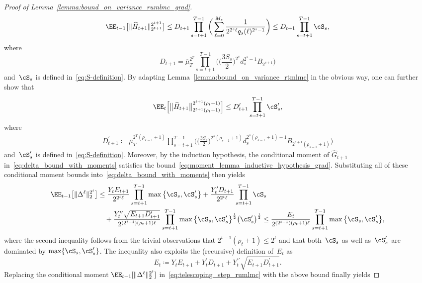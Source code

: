 \documentclass[11pt]{article}
\let\hat\widehat
\begin{document}
\begin{proof}[Proof of Lemma~\ref{lemma:bound_on_variance_rumlmc_grad}]
\[
    \EE_{t-1}\big[\|\hat H_{t+1}\|_{2^{t+1}}^{2^{t+1}}\big]
    \leq D_{t+1}\prod_{s=t+1}^{T-1}\bigg(\sum_{\ell=0}^{M_s}\frac{1}{2^{2^{s}\ell} q_s(\ell)^{2^{s}-1}}\bigg) \leq D_{t+1}\prod_{s=t+1}^{T-1} \cS_s, 
\]  
where
\[
 D_{t+1} = \overline\mu_T^{2^T} \prod_{s=t+1}^{T-1} \bigg(\bigg(\frac{3S_s}{2}\bigg)^{2^s} d_s^{2^s-1} B_{2^{s+1}}\bigg)
\]
and~$\cS_s$ is defined in~\eqref{eq:S-definition}. By adapting Lemma~\ref{lemma:bound_on_variance_rtmlmc} in the obvious way, one can further show that 
\begin{align*}
     \EE_{t}\Big[\big\|\hat{H}_{t+1}\big\|_{2^{t+1}(\rho_t+1)}^{2^{t+1}(\rho_t+1)}\Big]  \leq 
        D_{t+1}^\prime \prod_{s=t+1}^{T-1} \cS_s^\prime, 
\end{align*}
where
\begin{align*}
    D_{t+1}^\prime\coloneqq\overline\mu_T^{2^T(\rho_{T-1}+1)} \prod_{s=t+1}^{T-1} \bigg(\bigg(\frac{3S_s}{2}\bigg)^{2^{s}(\rho_{s-1}+1)} d_s^{2^{s}(\rho_{s-1}+1)-1} B_{2^{s+1}(\rho_{s-1}+1)}\bigg)
\end{align*}
and~$\cS_s^\prime$ is defined in~\eqref{eq:S-definition}. Moreover, by the induction hypothesis, the conditional moment of $\hat{G}_{t+1}$ in~\eqref{eq:delta_bound_with_moments} satisfies the bound~\eqref{eq:moment_lemma_inductive_hypothesis_grad}. Substituting all  of these conditional moment bounds into~\eqref{eq:delta_bound_with_moments} then yields
\begin{equation*}
    \begin{aligned}
    \EE_{t-1}\big[\|\Delta^\ell \|_{2}^{2^t}\big] &\leq   \frac{Y_t E_{t+1} }{2^{2^{t}\ell}}\prod_{s=t+1}^{T-1}\max\big\{\cS_s, \cS_s^\prime \big\}
    + \frac{ Y^\prime_t D_{t+1} }{2^{2^t \ell}}\prod_{s=t+1}^{T-1} \cS_s \\
    &\quad + \frac{Y_t^{\prime\prime} \sqrt{E_{t+1} {D_{t+1}^\prime}}}{2^{(2^{t-1})(\rho_t+1)\ell}}\prod_{s=t+1}^{T-1}\max\big\{\cS_s, \cS_s^\prime \big\}^\frac{1}{2} \big(\cS_s^\prime\big)^\frac{1}{2} \leq \frac{E_t }{2^{(2^{t-1})(\rho_t+1)\ell}} \prod_{s=t+1}^{T-1}\max\big\{\cS_s, \cS_s^\prime \big\},
\end{aligned}
\end{equation*}
where the second inequality follows from the trivial observations that $2^{t-1}(\rho_t+1)\leq 2^{t}$ and that both~$\cS_s$ as well as~$\cS_s'$ are dominated by $\max\{\cS_s, \cS_s^\prime \}$. The inequality also exploits the (recursive) definition of~$E_t$ as
\[
    E_t \coloneqq Y_t E_{t+1} + Y^\prime_t D_{t+1} + Y_t^{\prime\prime} \sqrt{E_{t+1} {D_{t+1}^\prime}}.
\]
Replacing the conditional moment $\EE_{t-1}[\|\Delta^\ell \|_{2}^{2^t}]$ in~\eqref{eq:telescoping_step_rumlmc} with the above bound finally yields

\end{proof}
\end{document}
